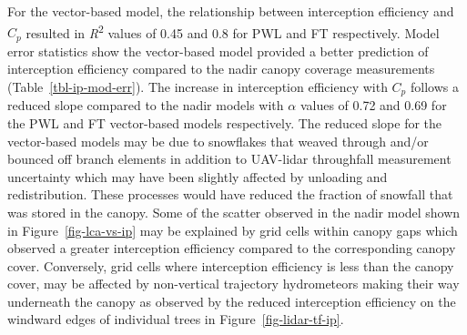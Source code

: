 \documentclass[
  letterpaper,
]{tex/uofsthesis-cs}
\begin{document}
For the vector-based model, the relationship between interception
efficiency and \(C_p\) resulted in \emph{R}\textsuperscript{2} values of
0.45 and 0.8 for PWL and FT respectively. Model error statistics show
the vector-based model provided a better prediction of interception
efficiency compared to the nadir canopy coverage measurements
(Table~\ref{tbl-ip-mod-err}). The increase in interception efficiency
with \(C_p\) follows a reduced slope compared to the nadir models with
\(\alpha\) values of 0.72 and 0.69 for the PWL and FT vector-based
models respectively. The reduced slope for the vector-based models may
be due to snowflakes that weaved through and/or bounced off branch
elements in addition to UAV-lidar throughfall measurement uncertainty
which may have been slightly affected by unloading and redistribution.
These processes would have reduced the fraction of snowfall that was
stored in the canopy. Some of the scatter observed in the nadir model
shown in Figure~\ref{fig-lca-vs-ip} may be explained by grid cells
within canopy gaps which observed a greater interception efficiency
compared to the corresponding canopy cover. Conversely, grid cells where
interception efficiency is less than the canopy cover, may be affected
by non-vertical trajectory hydrometeors making their way underneath the
canopy as observed by the reduced interception efficiency on the
windward edges of individual trees in Figure~\ref{fig-lidar-tf-ip}.
\end{document}
